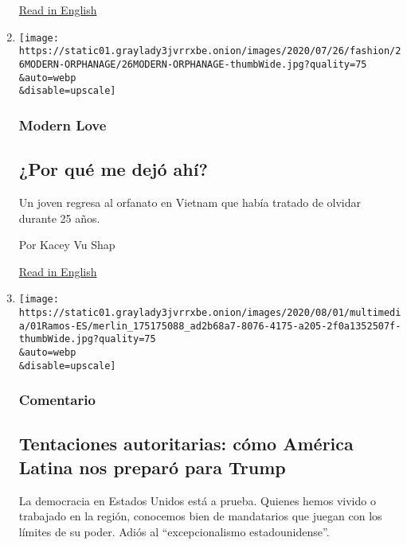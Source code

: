\begin{enumerate}
  \href{https://www.nytimes3xbfgragh.onion/2020/08/02/world/americas/mexico-tv-virus-telenovela.html}{Read
  in English}
\item
  \href{/es/2020/08/02/espanol/estilos-de-vida/adopcion-orfanato.html}{}

  \texttt{[image: https://static01.graylady3jvrrxbe.onion/images/2020/07/26/fashion/26MODERN-ORPHANAGE/26MODERN-ORPHANAGE-thumbWide.jpg?quality=75\\\&auto=webp\\\&disable=upscale]}

  \hypertarget{modern-love}{%
  \subsubsection{Modern Love}\label{modern-love}}

  \hypertarget{por-quuxe9-me-dejuxf3-ahuxed}{%
  \subsection{¿Por qué me dejó
  ahí?}\label{por-quuxe9-me-dejuxf3-ahuxed}}

  Un joven regresa al orfanato en Vietnam que había tratado de olvidar
  durante 25 años.

  Por Kacey Vu Shap

  \href{https://www.nytimes3xbfgragh.onion/2020/07/24/style/modern-love-adoption-vietnam-why-did-she-leave-me-there.html}{Read
  in English}
\item
  \href{/es/2020/08/01/espanol/opinion/trump-autoritarismo.html}{}

  \texttt{[image: https://static01.graylady3jvrrxbe.onion/images/2020/08/01/multimedia/01Ramos-ES/merlin\_175175088\_ad2b68a7-8076-4175-a205-2f0a1352507f-thumbWide.jpg?quality=75\\\&auto=webp\\\&disable=upscale]}

  \hypertarget{comentario-1}{%
  \subsubsection{Comentario}\label{comentario-1}}

  \hypertarget{tentaciones-autoritarias-cuxf3mo-amuxe9rica-latina-nos-preparuxf3-para-trump}{%
  \subsection{Tentaciones autoritarias: cómo América Latina nos preparó
  para
  Trump}\label{tentaciones-autoritarias-cuxf3mo-amuxe9rica-latina-nos-preparuxf3-para-trump}}

  La democracia en Estados Unidos está a prueba. Quienes hemos vivido o
  trabajado en la región, conocemos bien de mandatarios que juegan con
  los límites de su poder. Adiós al ``excepcionalismo estadounidense''.


\end{enumerate}
